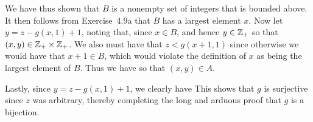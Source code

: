 {{    We have thus shown that $B$ is a nonempty set of integers that is bounded above.
    It then follows from Exercise~4.9a that $B$ has a largest element $x$.
    Now let $y = z - g(x,1) + 1$, noting that, since $x \in B$,
    and hence $y \in {\mathbb{Z}}_+$ so that $(x,y) \in {\mathbb{Z}}_+ \times {\mathbb{Z}}_+$.
    We also must have that $z < g(x+1,1)$ since otherwise we would have that $x+1 \in B$, which would violate the definition of $x$ as being the largest element of $B$.
    Thus we have
    so that $(x,y) \in A$.
    
    Lastly, since $y = z - g(x,1) + 1$, we clearly have
    This shows that $g$ is surjective since $z$ was arbitrary, thereby completing the long and arduous proof that $g$ is a bijection.
  }
}

